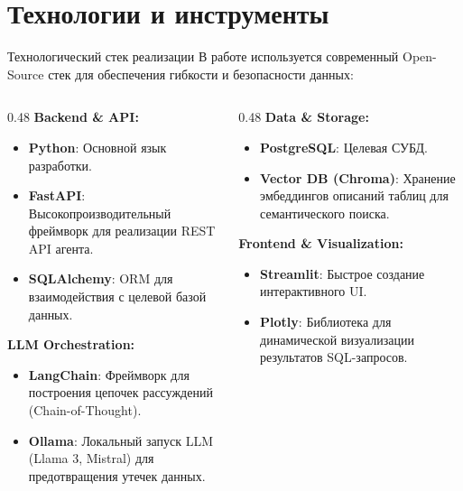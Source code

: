 \documentclass[10pt, aspectratio=169, unicode]{beamer}
\begin{document}
\section{Технологии и инструменты}

\begin{frame}{Технологический стек реализации}
    В работе используется современный Open-Source стек для обеспечения гибкости и безопасности данных:

    \begin{columns}[T]
        \begin{column}{0.48\textwidth}
            \textbf{Backend \& API:}
            \begin{itemize}
                \item \textbf{Python}: Основной язык разработки.
                \item \textbf{FastAPI}: Высокопроизводительный фреймворк для реализации REST API агента.
                \item \textbf{SQLAlchemy}: ORM для взаимодействия с целевой базой данных.
            \end{itemize}
            
            \textbf{LLM Orchestration:}
            \begin{itemize}
                \item \textbf{LangChain}: Фреймворк для построения цепочек рассуждений (Chain-of-Thought).
                \item \textbf{Ollama}: Локальный запуск LLM (Llama 3, Mistral) для предотвращения утечек данных.
            \end{itemize}
        \end{column}
        
        \begin{column}{0.48\textwidth}
            \textbf{Data \& Storage:}
            \begin{itemize}
                \item \textbf{PostgreSQL}: Целевая СУБД.
                \item \textbf{Vector DB (Chroma)}: Хранение эмбеддингов описаний таблиц для семантического поиска.
            \end{itemize}
            
            \textbf{Frontend \& Visualization:}
            \begin{itemize}
                \item \textbf{Streamlit}: Быстрое создание интерактивного UI.
                \item \textbf{Plotly}: Библиотека для динамической визуализации результатов SQL-запросов.
            \end{itemize}
        \end{column}
    \end{columns}
\end{frame}
\end{document}

